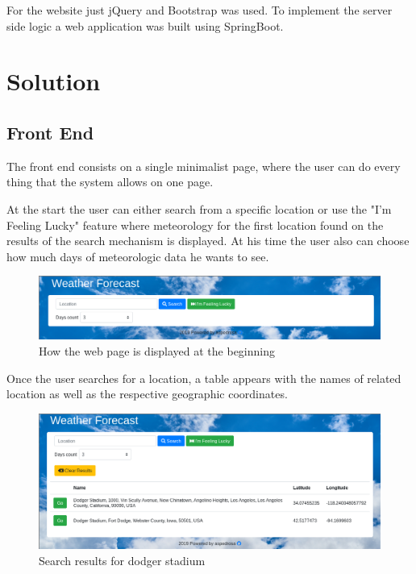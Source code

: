 \documentclass[12pt]{article}
\begin{document}
For the website just jQuery and Bootstrap was used. To implement the server side logic a web
  application was built using SpringBoot.

\section{Solution}
\subsection{Front End}

The front end consists on a single minimalist page, where the user can do every thing
  that the system allows on one page.

At the start the user can either search from a specific location or use the "I'm Feeling Lucky"
  feature where meteorology for the first location found on the results of the search mechanism
  is displayed. At his time the user also can choose how much days of meteorologic data he wants
  to see.

\begin{figure}[h]
  \center
  \includegraphics[scale=0.35]{start_website.png}
  \caption{How the web page is displayed at the beginning}
\end{figure}

Once the user searches for a location, a table appears with the names of related location
  as well as the respective geographic coordinates.

\begin{figure}[h]
  \center
  \includegraphics[scale=0.35]{after_search_website.png}
  \caption{Search results for dodger stadium}
\end{figure}
\end{document}
